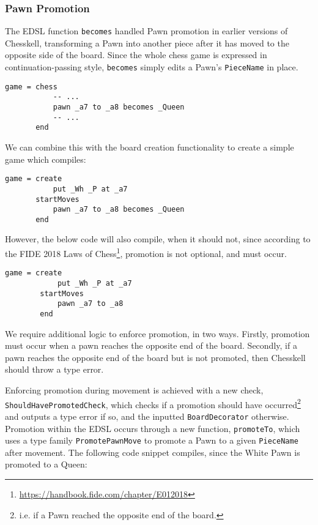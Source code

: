 \documentclass[12pt, a4paper, bibliography=totocnumbered]{scrartcl}
\begin{document}
\subsubsection{Pawn Promotion}

The EDSL function \lstinline[basicstyle=\ttfamily]{becomes} handled Pawn promotion in earlier versions of Chesskell, transforming a Pawn into another piece after it has moved to the opposite side of the board. Since the whole chess game is expressed in continuation-passing style, \lstinline[basicstyle=\ttfamily]{becomes} simply edits a Pawn's \lstinline[basicstyle=\ttfamily]{PieceName} in place. %

\begin{lstlisting}
game = chess
           -- ...
           pawn _a7 to _a8 becomes _Queen
           -- ...
       end
\end{lstlisting}

We can combine this with the board creation functionality to create a simple game which compiles:

\begin{lstlisting}
game = create
           put _Wh _P at _a7
       startMoves
           pawn _a7 to _a8 becomes _Queen
       end
\end{lstlisting}

However, the below code will also compile, when it should not, since according to the FIDE 2018 Laws of Chess\footnote{\url{https://handbook.fide.com/chapter/E012018}}, promotion is not optional, and must occur.

\begin{lstlisting}
game = create
            put _Wh _P at _a7
        startMoves
            pawn _a7 to _a8
        end
\end{lstlisting}

We require additional logic to enforce promotion, in two ways. Firstly, promotion must occur when a pawn reaches the opposite end of the board. Secondly, if a pawn reaches the opposite end of the board but is not promoted, then Chesskell should throw a type error.

Enforcing promotion during movement is achieved with a new check, \lstinline[basicstyle=\ttfamily]{ShouldHavePromotedCheck}, which checks if a promotion should have occurred\footnote{i.e. if a Pawn reached the opposite end of the board.} and outputs a type error if so, and the inputted \lstinline[basicstyle=\ttfamily]{BoardDecorator} otherwise. Promotion within the EDSL occurs through a new function, \lstinline[basicstyle=\ttfamily]{promoteTo}, which uses a type family \lstinline[basicstyle=\ttfamily]{PromotePawnMove} to promote a Pawn to a given \lstinline[basicstyle=\ttfamily]{PieceName} after movement. The following code snippet compiles, since the White Pawn is promoted to a Queen:
\end{document}
